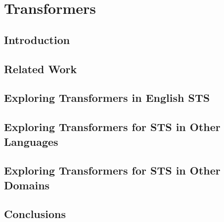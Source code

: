 \chapter{\label{cha:sts_transformers}Transformers}

\section{Introduction}
\cite{devlin-etal-2019-bert}
\section{Related Work}

\section{Exploring Transformers in English STS}

\section{Exploring Transformers for STS in Other Languages}

\section{Exploring Transformers for STS in Other Domains}

\section{Conclusions}